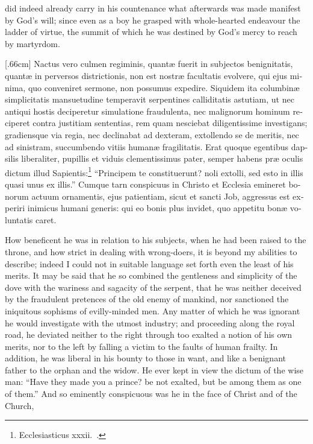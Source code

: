\documentclass[10pt]{book}
\newcounter{engnote}
\begin{document}
\vspace{-2\parskip}
\vspace{-3\lineskip}
did indeed already carry in his countenance what afterwards was made manifest by God's will; since even as a boy he grasped with whole-hearted endeavour the ladder of virtue, the summit of which he was destined by God's mercy to reach by martyrdom.

\begin{paracol}{2}

\begin{otherlanguage}{latin}
[.66cm]
Nactus vero culmen regiminis, quant\ae{} fuerit in subjectos benignitatis, quant\ae{} in perversos districtionis, non est nostr\ae{} facultatis evolvere, qui ejus minima, quo conveniret sermone, non possumus expedire. Siquidem ita columbin\ae{} simplicitatis mansuetudine temperavit serpentines calliditatis astutiam, ut nec antiqui hostis deciperetur simulatione fraudulenta, nec malignorum hominum reciperet contra justitiam sententias, rem quam nesciebat diligentissime investigans; gradiensque via regia, nec declinabat ad dexteram, extollendo se de meritis, nec ad sinistram, succumbendo vitiis human\ae{} fragilitatis. Erat quoque egentibus dapsilis liberaliter, pupillis et viduis clementissimus pater, semper habens pr\ae{} oculis dictum illud Sapientis:\footnote[\arabic{engnote}]{Ecclesiasticus xxxii.\ .} ``Principem te constituerunt? noli extolli, sed esto in illis quasi unus ex illis.'' Cumque tarn conspicuus in Christo et Ecclesia emineret bonorum actuum ornamentis, ejus patientiam, sicut et sancti Job, aggressus est experiri inimicus humani generis: qui eo bonis plus invidet, quo appetitu bon\ae{} voluntatis caret.
\end{otherlanguage}

\switchcolumn

How beneficent he was in relation to his subjects, when he had been raised to the throne, and how strict in dealing with wrong-doers, it is beyond my abilities to describe; indeed I could not in suitable language set forth even the least of his merits. It may be said that he so combined the gentleness and simplicity of the dove with the wariness and sagacity of the serpent, that he was neither deceived by the fraudulent pretences of the old enemy of mankind, nor sanctioned the iniquitous sophisms of evilly-minded men. Any matter of which he was ignorant he would investigate with the utmost industry; and proceeding along the royal road, he deviated neither to the right through too exalted a notion of his own merits, nor to the left by falling a victim to the faults of human frailty. In addition, he was liberal in his bounty to those in want, and like a benignant father to the orphan and the widow. He ever kept in view the dictum of the wise man: ``Have they made you a prince? be not exalted, but be among them as one of them.'' And so eminently conspicuous was he in the face of Christ and of the Church,\linebreak{}

\end{paracol}
\end{document}
